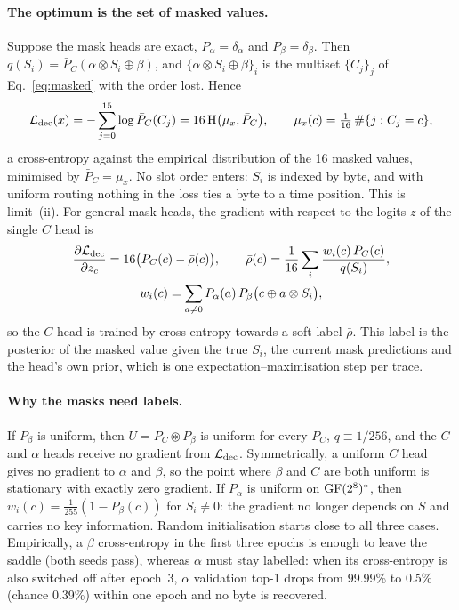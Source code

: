 \paragraph{The optimum is the set of masked values.}
Suppose the mask heads are exact, $P_\alpha=\delta_\alpha$ and $P_\beta=\delta_\beta$. Then
$q(S_i)=\bar P_C(\alpha\otimes S_i\oplus\beta)$, and $\{\alpha\otimes S_i\oplus\beta\}_i$ is the multiset
$\{C_j\}_j$ of Eq.~\eqref{eq:masked} with the order lost. Hence
\begin{equation}
  \mathcal{L}_{\mathrm{dec}}(x) = -\sum_{j=0}^{15}\log \bar P_C(C_j)
  = 16\,\mathrm{H}\big(\mu_x,\bar P_C\big),\qquad \mu_x(c)=\tfrac{1}{16}\,\#\{j: C_j=c\},
\end{equation}
a cross-entropy against the empirical distribution of the 16 masked values, minimised by $\bar P_C=\mu_x$.
No slot order enters: $S_i$ is indexed by byte, and with uniform routing nothing in the loss ties a byte to
a time position. This is limit~(ii). For general mask heads, the gradient with respect to the logits $z$
of the single $C$ head is
\begin{equation}
  \begin{gathered}
  \frac{\partial\mathcal{L}_{\mathrm{dec}}}{\partial z_c} = 16\big(P_C(c)-\bar\rho(c)\big),\qquad
  \bar\rho(c)=\frac1{16}\sum_i\frac{w_i(c)\,P_C(c)}{q(S_i)},\\
  w_i(c)=\sum_{a\neq0} P_\alpha(a)\,P_\beta\big(c\oplus a\otimes S_i\big),
  \end{gathered}
\end{equation}
so the $C$ head is trained by cross-entropy towards a soft label $\bar\rho$. This label is the posterior of
the masked value given the true $S_i$, the current mask predictions and the head's own prior, which is one
expectation--maximisation step per trace.

\paragraph{Why the masks need labels.}
If $P_\beta$ is uniform, then $U=\bar P_C\circledast P_\beta$ is uniform for every $\bar P_C$, $q\equiv1/256$,
and the $C$ and $\alpha$ heads receive no gradient from $\mathcal{L}_{\mathrm{dec}}$. Symmetrically, a uniform $C$ head gives no
gradient to $\alpha$ and $\beta$, so the point where $\beta$ and $C$ are both uniform is stationary with exactly
zero gradient. If $P_\alpha$ is uniform on $\mathrm{GF}(2^8)^\ast$, then $w_i(c)=\frac{1}{255}(1-P_\beta(c))$ for $S_i\neq0$:
the gradient no longer depends on $S$ and carries no key information. Random initialisation starts close to
all three cases. Empirically, a $\beta$ cross-entropy in the first three epochs is enough to leave the
saddle (both seeds pass), whereas $\alpha$ must stay labelled: when its cross-entropy is also switched off
after epoch~3, $\alpha$ validation top-1 drops from 99.99\% to 0.5\% (chance 0.39\%) within one epoch and no byte is recovered.

